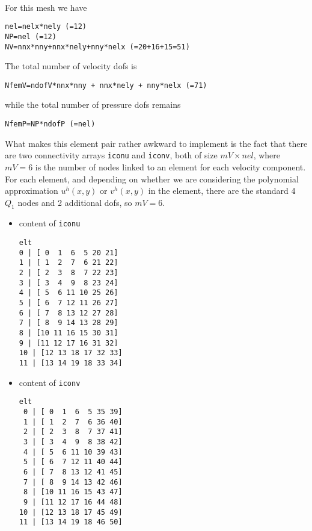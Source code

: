 \begin{center}
\\
\end{center}


For this mesh we have 

\begin{lstlisting}
nel=nelx*nely (=12) 
NP=nel (=12)
NV=nnx*nny+nnx*nely+nny*nelx (=20+16+15=51)
\end{lstlisting}

The total number of velocity dofs is 
\begin{lstlisting}
NfemV=ndofV*nnx*nny + nnx*nely + nny*nelx (=71)
\end{lstlisting}
while the total number of pressure dofs remains
\begin{lstlisting}
NfemP=NP*ndofP (=nel) 
\end{lstlisting}

What makes this element pair rather awkward to implement is the fact that 
there are two connectivity arrays {\tt iconu} and {\tt iconv}, both of size $mV\times nel$, where 
$mV=6$ is the number of nodes linked to an element for each velocity component. 
For each element, and depending on whether we are considering 
the polynomial approximation $u^h(x,y)$ or $v^h(x,y)$ in the element, there are the standard 4 $Q_1$ nodes and 2 additional 
dofs, so $mV=6$.
\begin{itemize}
\item content of {\tt iconu}
\begin{verbatim}
elt
0 | [ 0  1  6  5 20 21]
1 | [ 1  2  7  6 21 22]
2 | [ 2  3  8  7 22 23]
3 | [ 3  4  9  8 23 24]
4 | [ 5  6 11 10 25 26]
5 | [ 6  7 12 11 26 27]
6 | [ 7  8 13 12 27 28]
7 | [ 8  9 14 13 28 29]
8 | [10 11 16 15 30 31]
9 | [11 12 17 16 31 32]
10 | [12 13 18 17 32 33]
11 | [13 14 19 18 33 34]
\end{verbatim}
\item content of {\tt iconv}
\begin{verbatim}
elt
 0 | [ 0  1  6  5 35 39]
 1 | [ 1  2  7  6 36 40]
 2 | [ 2  3  8  7 37 41]
 3 | [ 3  4  9  8 38 42]
 4 | [ 5  6 11 10 39 43]
 5 | [ 6  7 12 11 40 44]
 6 | [ 7  8 13 12 41 45]
 7 | [ 8  9 14 13 42 46]
 8 | [10 11 16 15 43 47]
 9 | [11 12 17 16 44 48]
10 | [12 13 18 17 45 49]
11 | [13 14 19 18 46 50]
\end{verbatim}
\end{itemize}

